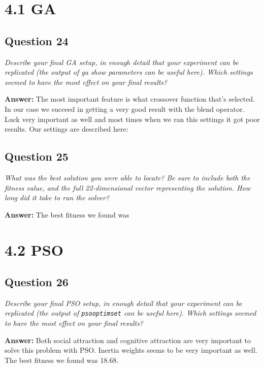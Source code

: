 \documentclass[a4paper]{article}
\begin{document}
\section*{4.1 GA}

\subsection*{Question 24}
\emph{Describe your final GA setup, in enough detail that your experiment can be replicated (the output of ga show parameters can be useful here). Which settings seemed to have the most effect on your final results?}

\textbf{Answer:} The most important feature is what crossover function that's selected. In our case we succeed in getting a very good result with the blend operator. Luck very important as well and most times when we ran this settings it got poor results. 
Our settings are described here:


\subsection*{Question 25}
\emph{What was the best solution you were able to locate? Be sure to
include both the fitness value, and the full 22-dimensional vector representing
the solution. How long did it take to run the solver?}

\textbf{Answer:} The best fitness we found was

\section*{4.2 PSO}

\subsection*{Question 26}
\emph{Describe your final PSO setup, in enough detail that your experiment can be replicated (the output of \texttt{psooptimset} can be useful here). Which settings seemed to have the most effect on your final results?}

\textbf{Answer:} Both social attraction and cognitive attraction are very important to solve this problem with PSO. Inertia weights seems to be very important as well. The best fitness we found was 18.68.

\end{document}
